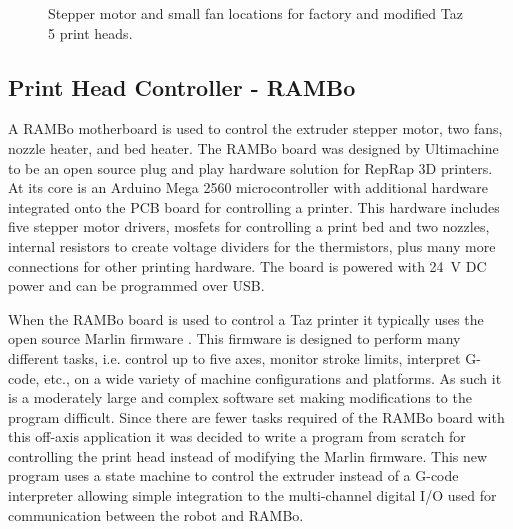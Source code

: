 \documentclass[main.tex]{subfiles}
\begin{document}
\begin{figure}
\linethickness{1pt}
\centering
	\caption{Stepper motor and small fan locations for factory and modified Taz 5 print heads.}
	\label{fig:printheads}
\end{figure}

\subsection{Print Head Controller - RAMBo}
A RAMBo motherboard is used to control the extruder stepper motor, two fans, nozzle heater, and bed heater.
The RAMBo board was designed by Ultimachine to be an open source plug and play hardware solution for RepRap 3D printers.
At its core is an Arduino Mega 2560 microcontroller with additional hardware integrated onto the PCB board for controlling a printer.
This hardware includes five stepper motor drivers, mosfets for controlling a print bed and two nozzles, internal resistors to create voltage dividers for the thermistors, plus many more connections for other printing hardware.
The board is powered with \SI{24}{\volt} DC power and can be programmed over USB.

When the RAMBo board is used to control a Taz printer it typically uses the open source Marlin firmware \cite{marlin2017}.
This firmware is designed to perform many different tasks, i.e. control up to five axes, monitor stroke limits, interpret G-code, etc., on a wide variety of machine configurations and platforms.
As such it is a moderately large and complex software set making modifications to the program difficult.
Since there are fewer tasks required of the RAMBo board with this off-axis application it was decided to write a program from scratch for controlling the print head instead of modifying the Marlin firmware.
This new program \cite{rambo2017} uses a state machine to control the extruder instead of a G-code interpreter allowing simple integration to the multi-channel digital I/O used for communication between the robot and RAMBo.
\end{document}
